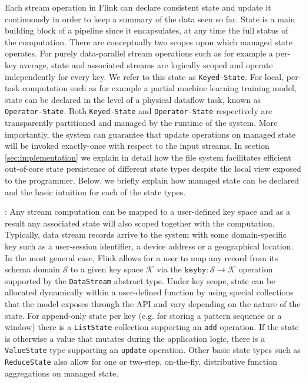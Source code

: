 Each stream operation in Flink can declare consistent state and update it continuously in order to keep a summary of the data seen so far. State is a main building block of a pipeline since it encapsulates, at any time the full status of the computation. There are conceptually two scopes upon which managed state operates. For purely data-parallel stream operations such as for example a per-key average, state and associated streams are logically scoped and operate independently for every key. We refer to this state as \texttt{Keyed-State}. For local, per-task computation such as for example a partial machine learning training model, state can be declared in the level of a physical dataflow task, known as \texttt{Operator-State}. Both \texttt{Keyed-State} and \texttt{Operator-State} respectively are transparently partitioned and managed by the runtime of the system. More importantly, the system can guarantee that update operations on managed state will be invoked exactly-once with respect to the input streams. In section \ref{sec:implementation} we explain in detail how the file system facilitates efficient out-of-core state persistence of different state types despite the local  view exposed to the programmer. Below, we briefly explain how managed state can be declared and the basic intuition for each of the state types. 

: Any stream computation can be mapped to a user-defined key space and as a result any associated state will also scoped together with the computation. Typically, data stream records arrive to the system with some domain-specific key such as a user-session identifier, a device address or a geographical location. In the most general case, Flink allows for a user to map any record from its schema domain $\mathcal{S}$ to a given key space $\mathcal{K}$ via the $\texttt{keyby}: \mathcal{S} \rightarrow \mathcal{K}$ operation supported by the \texttt{DataStream} abstract type. Under key scope, state can be allocated dynamically within a user-defined function by using special collections that the model exposes through the API and vary depending on the nature of the state. For append-only state per key (e.g. for storing a pattern sequence or a window) there is a \texttt{ListState} collection supporting an \texttt{add} operation. If  the state is otherwise a value that mutates during the application logic, there is a \texttt{ValueState} type supporting an \texttt{update} operation. Other basic state types such as \texttt{ReduceState} also allow for one or two-step, on-the-fly, distributive function aggregations on managed state. 

